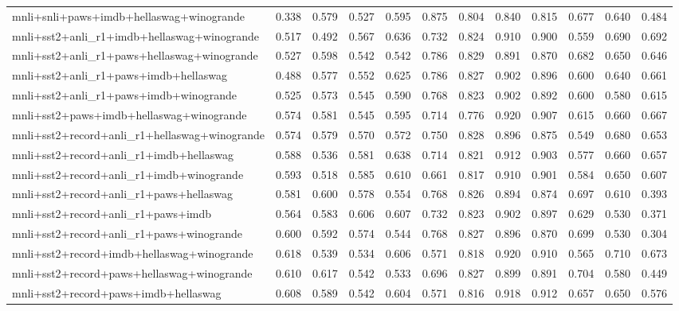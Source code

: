 \begin{table}[t]
\begin{tabular}{lrrrrrrrrrrr}
    mnli+snli+paws+imdb+hellaswag+winogrande & 0.338 & 0.579 & 0.527 & 0.595 & 0.875 & 0.804 & 0.840 & 0.815 & 0.677 & 0.640 & 0.484 \\
    mnli+sst2+anli\_r1+imdb+hellaswag+winogrande & 0.517 & 0.492 & 0.567 & 0.636 & 0.732 & 0.824 & 0.910 & 0.900 & 0.559 & 0.690 & 0.692 \\
    mnli+sst2+anli\_r1+paws+hellaswag+winogrande & 0.527 & 0.598 & 0.542 & 0.542 & 0.786 & 0.829 & 0.891 & 0.870 & 0.682 & 0.650 & 0.646 \\
    mnli+sst2+anli\_r1+paws+imdb+hellaswag & 0.488 & 0.577 & 0.552 & 0.625 & 0.786 & 0.827 & 0.902 & 0.896 & 0.600 & 0.640 & 0.661 \\
    mnli+sst2+anli\_r1+paws+imdb+winogrande & 0.525 & 0.573 & 0.545 & 0.590 & 0.768 & 0.823 & 0.902 & 0.892 & 0.600 & 0.580 & 0.615 \\
    mnli+sst2+paws+imdb+hellaswag+winogrande & 0.574 & 0.581 & 0.545 & 0.595 & 0.714 & 0.776 & 0.920 & 0.907 & 0.615 & 0.660 & 0.667 \\
    mnli+sst2+record+anli\_r1+hellaswag+winogrande & 0.574 & 0.579 & 0.570 & 0.572 & 0.750 & 0.828 & 0.896 & 0.875 & 0.549 & 0.680 & 0.653 \\
    mnli+sst2+record+anli\_r1+imdb+hellaswag & 0.588 & 0.536 & 0.581 & 0.638 & 0.714 & 0.821 & 0.912 & 0.903 & 0.577 & 0.660 & 0.657 \\
    mnli+sst2+record+anli\_r1+imdb+winogrande & 0.593 & 0.518 & 0.585 & 0.610 & 0.661 & 0.817 & 0.910 & 0.901 & 0.584 & 0.650 & 0.607 \\
    mnli+sst2+record+anli\_r1+paws+hellaswag & 0.581 & 0.600 & 0.578 & 0.554 & 0.768 & 0.826 & 0.894 & 0.874 & 0.697 & 0.610 & 0.393 \\
    mnli+sst2+record+anli\_r1+paws+imdb & 0.564 & 0.583 & 0.606 & 0.607 & 0.732 & 0.823 & 0.902 & 0.897 & 0.629 & 0.530 & 0.371 \\
    mnli+sst2+record+anli\_r1+paws+winogrande & 0.600 & 0.592 & 0.574 & 0.544 & 0.768 & 0.827 & 0.896 & 0.870 & 0.699 & 0.530 & 0.304 \\
    mnli+sst2+record+imdb+hellaswag+winogrande & 0.618 & 0.539 & 0.534 & 0.606 & 0.571 & 0.818 & 0.920 & 0.910 & 0.565 & 0.710 & 0.673 \\
    mnli+sst2+record+paws+hellaswag+winogrande & 0.610 & 0.617 & 0.542 & 0.533 & 0.696 & 0.827 & 0.899 & 0.891 & 0.704 & 0.580 & 0.449 \\
    mnli+sst2+record+paws+imdb+hellaswag & 0.608 & 0.589 & 0.542 & 0.604 & 0.571 & 0.816 & 0.918 & 0.912 & 0.657 & 0.650 & 0.576 \\

\end{tabular}
\end{table}
